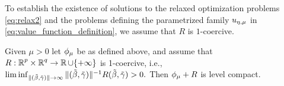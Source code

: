 To establish the existence of solutions to the relaxed
optimization problems \eqref{eq:relax2} and the
problems defining the parametrized family ${u_{\eta,\mu}}$ in
\eqref{eq:value_function_definition}, we assume that $R$ is $1$-coercive.
\begin{lemma}\label{lem:lb plus 1c}
Given $\mu>0$ let $\phi_\mu$ be as defined above, and assume that 
$R:{\operatorname{\mathbb{R}}^p}\times{\operatorname{\mathbb{R}}^q}\rightarrow \operatorname{\mathbb{R}}\cup\{+\infty\}$
is 1-coercive, i.e., 
\(
\liminf_{\Vert{(\tilde\beta,{\tilde{\gamma}})}\Vert\rightarrow\infty}\Vert{(\tilde\beta,{\tilde{\gamma}})}\Vert^{-1}R(\tilde\beta,{\tilde{\gamma}})>0.
\)
Then 
$\phi_\mu+R$ 
is level compact.
\end{lemma}
%
